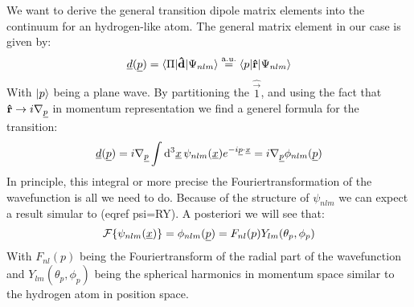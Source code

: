 We want to derive the general transition dipole matrix elements into the continuum for an hydrogen-like atom. The general matrix element in our case is given by:
\begin{equation*}
    \underline{d}(\underline{p}) = \braket{\Pi|\mathbf{\hat{d}}|\Psi_{nlm}} \stackrel{\mathrm{a.u.}}{=} \braket{p|\mathbf{\hat{r}}|\Psi_{nlm}}
\end{equation*}
With $\ket{p}$ being a plane wave. By partitioning the $\hat{\vec{1}}$, and using the fact that $\mathbf{\hat{r}} \rightarrow i\nabla_{\underline{p}}$ %
in momentum representation we find a generel formula for the transition:
\begin{equation*}
    \underline{d}(\underline{p}) = i\nabla_{\underline{p}}\int \mathrm{d}^3\underline{x}\,\psi_{nlm}(\underline{x}) e^{-i\underline{p}\cdot\underline{x}} = i\nabla_{\underline{p}}\phi_{nlm}(\underline{p})
\end{equation*}
In principle, this integral or more precise the Fouriertransformation of the wavefunction is all we need to do.
Because of the structure of $\psi_{nlm}$ we can expect a result simular to (eqref psi=RY).
A posteriori we will see that:
\begin{equation*}
    \mathcal{F}\{\psi_{nlm}(\underline{x})\} = \phi_{nlm}(\underline{p}) = F_{nl}(p)Y_{lm}(\theta_p, \phi_p)
\end{equation*}
With $F_{nl}(p)$ being the Fouriertransform of the radial part of the wavefunction and $Y_{lm}(\theta_p, \phi_p)$ being the spherical harmonics in momentum space similar to the hydrogen atom in position space.




